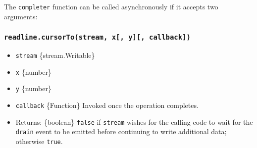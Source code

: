 \begin{Shaded}
\begin{Highlighting}[]
 
  \OperatorTok{=} \NormalTok{(}\StringTok{\textquotesingle{} \textquotesingle{}}\NormalTok{)}\OperatorTok{;}
  \OperatorTok{=}\KeywordTok{=\textgreater{}}\OperatorTok{;}
  \NormalTok{ [hits} \OperatorTok{:}\OperatorTok{,}\NormalTok{ line]}\OperatorTok{;}
\NormalTok{\}}
\end{Highlighting}
\end{Shaded}

The \texttt{completer} function can be called asynchronously if it
accepts two arguments:

\begin{Shaded}
\begin{Highlighting}[]
 \OperatorTok{,}
  \NormalTok{(}\OperatorTok{,}\NormalTok{ [[}\StringTok{\textquotesingle{}123\textquotesingle{}}\NormalTok{]}\OperatorTok{,}\NormalTok{ linePartial])}\OperatorTok{;}
\NormalTok{\}}
\end{Highlighting}
\end{Shaded}

\subsubsection{\texorpdfstring{\texttt{readline.cursorTo(stream,\ x{[},\ y{]}{[},\ callback{]})}}{readline.cursorTo(stream, x{[}, y{]}{[}, callback{]})}}\label{readline.cursortostream-x-y-callback}

\begin{itemize}
\tightlist
\item
  \texttt{stream} \{stream.Writable\}
\item
  \texttt{x} \{number\}
\item
  \texttt{y} \{number\}
\item
  \texttt{callback} \{Function\} Invoked once the operation completes.
\item
  Returns: \{boolean\} \texttt{false} if \texttt{stream} wishes for the
  calling code to wait for the
  \texttt{\textquotesingle{}drain\textquotesingle{}} event to be emitted
  before continuing to write additional data; otherwise \texttt{true}.
\end{itemize}

